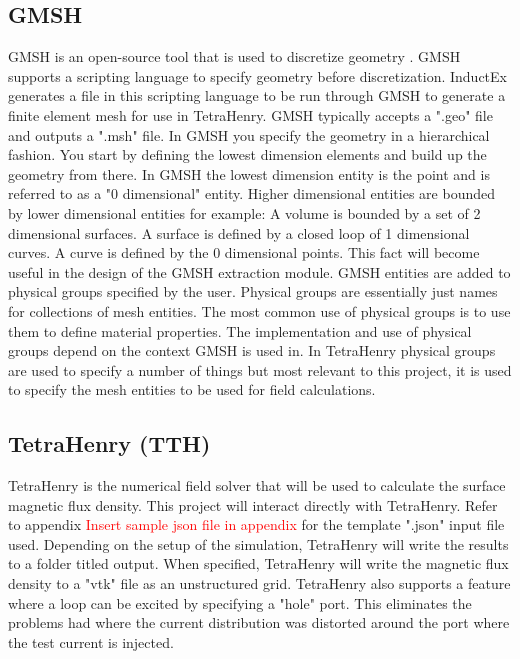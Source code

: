 \subsection{GMSH}
GMSH is an open-source tool that is used to discretize geometry \cite{GMSH}. GMSH supports a scripting language to specify geometry before discretization. InductEx generates a file in this scripting language to be run through GMSH to generate a finite element mesh for use in TetraHenry. GMSH typically accepts a ".geo" file and outputs a ".msh" file. In GMSH you specify the geometry in a hierarchical fashion. You start by defining the lowest dimension elements and build up the geometry from there. In GMSH the lowest dimension entity is the point and is referred to as a "0 dimensional" entity. Higher dimensional entities are bounded by lower dimensional entities for example: A volume is bounded by a set of 2 dimensional surfaces. A surface is defined by a closed loop of 1 dimensional curves. A curve is defined by the 0 dimensional points. This fact will become useful in the design of the GMSH extraction module. GMSH entities are added to physical groups specified by the user. Physical groups are essentially just names for collections of mesh entities. The most common use of physical groups is to use them to define material properties. The implementation and use of physical groups depend on the context GMSH is used in. In TetraHenry physical groups are used to specify a number of things but most relevant to this project, it is used to specify the mesh entities to be used for field calculations. \par

\subsection{TetraHenry (TTH)}
TetraHenry is the numerical field solver that will be used to calculate the surface magnetic flux density. This project will interact directly with TetraHenry. Refer to appendix \textcolor{red}{Insert sample json file in appendix} for the template ".json" input file used. Depending on the setup of the simulation, TetraHenry will write the results to a folder titled output. When specified, TetraHenry will write the magnetic flux density to a "vtk" file as an unstructured grid. TetraHenry also supports a feature where a loop can be excited by specifying a "hole" port. This eliminates the problems \cite{fluxNoiseSquidsStevenAnton} had where the current distribution was distorted around the port where the test current is injected. 

